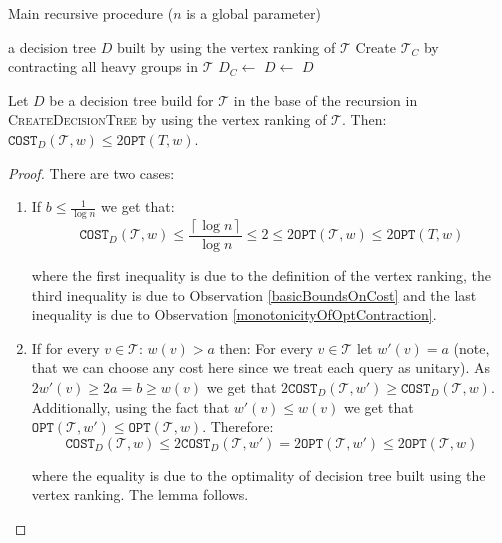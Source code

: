 \documentclass[a4paper, anonymous, numberwithinsect, pdfa, UKenglish,cleveref, autoref, thm-restate]{socg-lipics-v2021}
\newcommand{\br}[1]{\left( #1 \right)}
\newcommand{\cl}[1]{\left\lceil #1 \right\rceil}
\newcommand{\OPT}{\texttt{OPT}}
\newcommand{\COST}{\texttt{COST}}
\begin{document}
\begin{algorithm}
\caption{Main recursive procedure ($n$ is a global parameter)}
\label{createDecisionTree}
\begin{algorithmic}[1]
    \Procedure{CreateDecisionTree}{$\mathcal{T}$, $\left(a,b\right]$}
        \If{$b \leq \frac{1}{\log n}$ or for every $v \in \mathcal{T}$: $ w\br{v} > a$}
            \State \Return a decision tree $D$ built by using the vertex ranking of $\mathcal{T}$
        \Else{}
            \State Create $\mathcal{T}_C$ by contracting all heavy groups in $\mathcal{T}$ 
            \State $D_C \gets$ \Call{CreateDecisionTree}{$\mathcal{T}_C$, $\left(\frac{a}{2},a\right]$} \label{recursion}
            \State $D \gets$ \Call{ExtendDecTree}{$\mathcal{T}$, $D_C$, $\left(a,b\right]$}
            \State \Return $D$
        \EndIf
    \EndProcedure
\end{algorithmic}
\end{algorithm}

\begin{lemma}\label{baseOfRecursion}
    Let $D$ be a decision tree build for $\mathcal{T}$ in the base of the recursion in \textsc{CreateDecisionTree} by using the vertex ranking of $\mathcal{T}$. Then:
$
\COST_{D}\br{\mathcal{T},w}\leq 2\OPT(T,w)
$.
\begin{proof}
    There are two cases:
    \begin{enumerate}
        \item If $b\leq \frac{1}{\log n}$ we get that:
$$
\COST_{D}\br{\mathcal{T},w}\leq\frac{\cl{\log n}}{\log n}\leq 2\leq 2\OPT(\mathcal{T},w)\leq 2\OPT(T,w)
$$

where the first inequality is due to the definition of the vertex ranking, the third inequality is due to Observation \ref{basicBoundsOnCost} and the last inequality is due to Observation
\ref{monotonicityOfOptContraction}.
\item 
If for every ${v\in \mathcal{T}} $: $w\br{v}> a$ then: For every $v\in \mathcal{T}$ let $w'\br{v}=a$ (note, that we can choose any cost here since we treat each query as unitary). As $2w'\br{v}\geq2a=b \geq w\br{v}$ we get that $2\COST_D\br{\mathcal{T}, w'}\geq \COST_D\br{\mathcal{T}, w}$. Additionally, using the fact that $w'\br{v} \leq w\br{v}$ we get that $\OPT\br{\mathcal{T}, w'}\leq \OPT\br{\mathcal{T}, w}$. Therefore:
$$
\COST_D\br{\mathcal{T}, w}\leq 2\COST_D\br{\mathcal{T}, w'}=2\OPT\br{\mathcal{T}, w'}\leq 2\OPT\br{\mathcal{T}, w}
$$

where the equality is due to the optimality of decision tree built using the vertex ranking. The lemma follows.
    \end{enumerate}
\end{proof}
\end{lemma}
\end{document}
